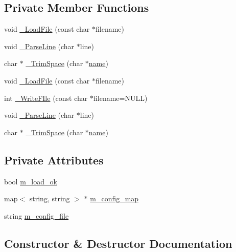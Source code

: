 \subsection*{Private Member Functions}
\begin{DoxyCompactItemize}
\item 
void \hyperlink{class_c_config_file_reader_adbcd0625f7710a89b30f9a3ff0a79372}{\+\_\+\+Load\+File} (const char $\ast$filename)
\item 
void \hyperlink{class_c_config_file_reader_a345994fb698e6e55d87ca8d1da3387be}{\+\_\+\+Parse\+Line} (char $\ast$line)
\item 
char $\ast$ \hyperlink{class_c_config_file_reader_a5251387a3e23b85debfb14a4e6af837c}{\+\_\+\+Trim\+Space} (char $\ast$\hyperlink{http__parser_8c_a8f8f80d37794cde9472343e4487ba3eb}{name})
\item 
void \hyperlink{class_c_config_file_reader_adbcd0625f7710a89b30f9a3ff0a79372}{\+\_\+\+Load\+File} (const char $\ast$filename)
\item 
int \hyperlink{class_c_config_file_reader_ab45aef198eda5987fee94510c549fbbe}{\+\_\+\+Write\+F\+Ile} (const char $\ast$filename=N\+U\+L\+L)
\item 
void \hyperlink{class_c_config_file_reader_a345994fb698e6e55d87ca8d1da3387be}{\+\_\+\+Parse\+Line} (char $\ast$line)
\item 
char $\ast$ \hyperlink{class_c_config_file_reader_a94910b7533dfaad8e4d6d33ebe4c22cf}{\+\_\+\+Trim\+Space} (char $\ast$\hyperlink{http__parser_8c_a8f8f80d37794cde9472343e4487ba3eb}{name})
\end{DoxyCompactItemize}
\subsection*{Private Attributes}
\begin{DoxyCompactItemize}
\item 
bool \hyperlink{class_c_config_file_reader_aece2f8ddd83db181c2b2c50ede873483}{m\+\_\+load\+\_\+ok}
\item 
map$<$ string, string $>$ $\ast$ \hyperlink{class_c_config_file_reader_aa49348ac308eae6be2d2c7e0d2ab21bf}{m\+\_\+config\+\_\+map}
\item 
string \hyperlink{class_c_config_file_reader_a6aca4d63a315b0fad0b96e1d013d486e}{m\+\_\+config\+\_\+file}
\end{DoxyCompactItemize}


\subsection{Constructor \& Destructor Documentation}
\hypertarget{class_c_config_file_reader_af7dfba388997ac70863ef5110d097247}{}
